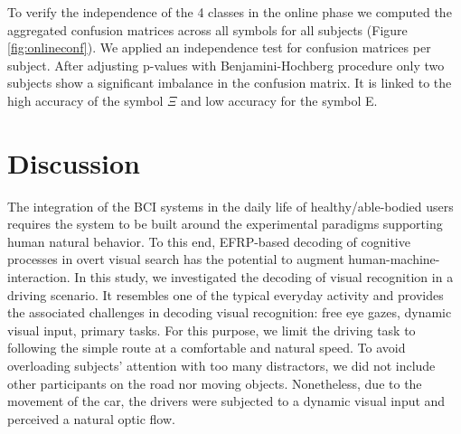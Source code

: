 \documentclass[12pt]{iopart}
\begin{document}
To verify the independence of the 4 classes in the online phase
we computed the aggregated confusion matrices across all symbols for all subjects (Figure \ref{fig:onlineconf}).
We applied an independence test for confusion matrices per subject.
After adjusting p-values with Benjamini-Hochberg procedure
only two subjects show a significant imbalance in the
confusion matrix. It is linked to the high accuracy of the symbol $\Xi$ and low accuracy 
for the symbol E.


\section{Discussion}
\label{sec:discussion}

The integration of the BCI systems in the daily life of 
healthy/able-bodied users requires the system 
to be built around the experimental paradigms
 supporting human natural behavior.
To this end, EFRP-based decoding of cognitive 
processes in overt visual search has the potential
to augment human-machine-interaction. 
In this study, we investigated the decoding of visual recognition in a driving scenario.
It resembles one of the typical everyday activity
and provides the associated challenges in decoding visual recognition:
free eye gazes, dynamic visual input, primary tasks.
For this purpose, we limit the driving task to following 
the simple route at a comfortable and natural speed.
To avoid overloading subjects' attention with too many distractors,
we did not include other participants on the road nor moving objects.
Nonetheless, due to the movement of the car, the drivers
were subjected to a dynamic visual input and perceived a
natural optic flow.
\end{document}
